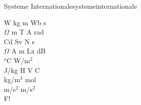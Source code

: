 \begin{song}{Systeme Internationale}{systemeinternationale}
\begin{vers}
W kg m Wb s\\
$\Omega$ m T A rad\\
Cd Sv N s\\
$\Omega$ A m Lx dB\\
$^o$C W/m$^2$\\
J/kg H V C\\
kg/m$^3$ mol\\
m/s$^2$ m/s$^2$\\
F!\\
\end{vers}
\end{song}
